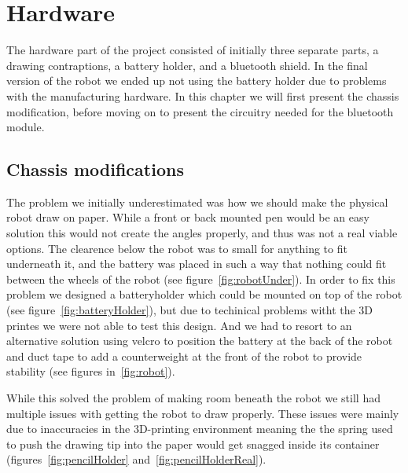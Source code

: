 \chapter{Hardware}\label{ch:hardware}
The hardware part of the project consisted of initially three separate parts, a drawing contraptions, a battery holder, and a bluetooth shield. 
In the final version of the robot we ended up not using the battery holder due to problems with the manufacturing hardware. 
In this chapter we will first present the chassis modification, before moving on to present the circuitry needed for the bluetooth module. 

\section{Chassis modifications}
The problem we initially underestimated was how we should make the physical robot draw on paper. While a front or back mounted pen would be an easy solution this would not create the angles properly, and thus was not a real viable options. The clearence below the robot was to small for anything to fit underneath it, and the battery was placed in such a way that nothing could fit between the wheels of the robot (see figure~\ref{fig:robotUnder}). In order to fix this problem we designed a batteryholder which could be mounted on top of the robot (see figure~\ref{fig:batteryHolder}), but due to techinical problems witht the 3D printes we were not able to test this design. And we had to resort to an alternative solution using velcro to position the battery at the back of the robot and duct tape to add a counterweight at the front of the robot to provide stability (see figures in~\ref{fig:robot}). 

\bigskip\noindent
While this solved the problem of making room beneath the robot we still had multiple issues with getting the robot to draw properly. These issues were mainly due to inaccuracies in the 3D-printing environment meaning the the spring used to push the drawing tip into the paper would get snagged inside its container (figures~\ref{fig:pencilHolder} and~\ref{fig:pencilHolderReal}).


